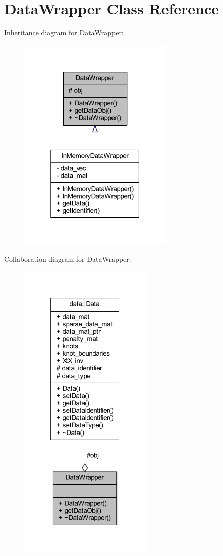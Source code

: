 \hypertarget{class_data_wrapper}{}\section{Data\+Wrapper Class Reference}
\label{class_data_wrapper}


Inheritance diagram for Data\+Wrapper\+:\nopagebreak
\begin{figure}[H]
\begin{center}
\leavevmode
\includegraphics[width=211pt]{class_data_wrapper__inherit__graph}
\end{center}
\end{figure}


Collaboration diagram for Data\+Wrapper\+:
\nopagebreak
\begin{figure}[H]
\begin{center}
\leavevmode
\includegraphics[width=181pt]{class_data_wrapper__coll__graph}
\end{center}
\end{figure}
